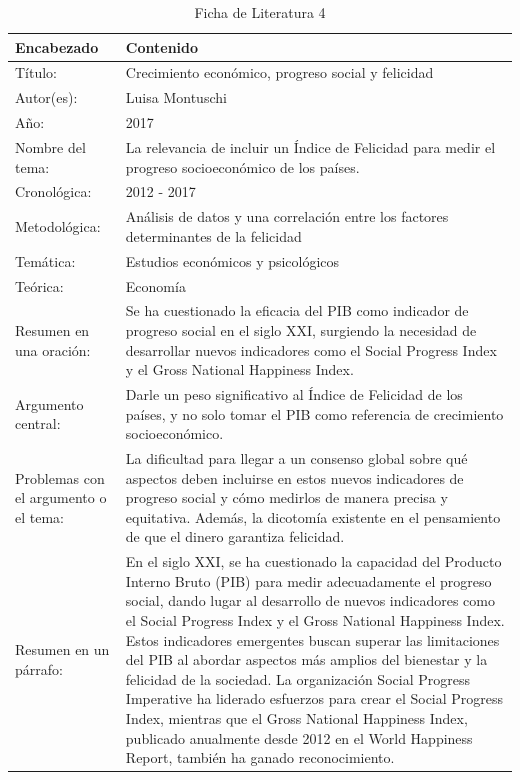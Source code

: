 \newpage
\begin{table}[H]
    \caption{Ficha de Literatura 4}
    \begin{center}
        \begin{tabular}{  m{3cm} | m{12cm}  }
        \hline\textbf{ Encabezado} & \textbf{Contenido }\\ \hline
        Título: &  Crecimiento económico, progreso social y felicidad\\ \hline
        Autor(es): & Luisa Montuschi  \\ \hline
        Año: &  2017\\ \hline
        Nombre del tema: &  La relevancia de incluir un Índice de Felicidad para medir el progreso socioeconómico de los países. \\ \hline
        Cronológica: &  2012 - 2017\\ \hline
        Metodológica: &  Análisis de datos y una correlación entre los factores determinantes de la felicidad \\ \hline
        Temática: & Estudios económicos y psicológicos \\ \hline
        Teórica:  & Economía \\ \hline
        Resumen en una oración: &  Se ha cuestionado la eficacia del PIB como indicador de progreso social en el siglo XXI, surgiendo la necesidad de desarrollar nuevos indicadores como el Social Progress Index y el Gross National Happiness Index.\\ \hline
        Argumento central: &  Darle un peso significativo al Índice de Felicidad de los países, y no solo tomar el PIB como referencia de crecimiento socioeconómico.\\ \hline
        Problemas con el argumento o el tema: &  La dificultad para llegar a un consenso global sobre qué aspectos deben incluirse en estos nuevos indicadores de progreso social y cómo medirlos de manera precisa y equitativa. Además, la dicotomía existente en el pensamiento de que el dinero garantiza felicidad.\\ \hline
        Resumen en un párrafo: & En el siglo XXI, se ha cuestionado la capacidad del Producto Interno Bruto (PIB) para medir adecuadamente el progreso social, dando lugar al desarrollo de nuevos indicadores como el Social Progress Index y el Gross National Happiness Index. Estos indicadores emergentes buscan superar las limitaciones del PIB al abordar aspectos más amplios del bienestar y la felicidad de la sociedad. La organización Social Progress Imperative ha liderado esfuerzos para crear el Social Progress Index, mientras que el Gross National Happiness Index, publicado anualmente desde 2012 en el World Happiness Report, también ha ganado reconocimiento. \\ \hline
        \end{tabular}
    \end{center}
\end{table}



